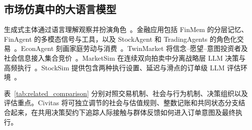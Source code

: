 \subsection{市场仿真中的大语言模型}

生成式主体通过语言理解观察并扮演角色~\cite{park2023generative}。金融应用包括 FinMem 的分层记忆、FinAgent 的多模态信号与工具，以及 StockAgent 和 TradingAgents 的角色化交易~\cite{yu2023finmem,zhang2024finagent,li2024stockagent,xiao2024tradingagents}。EconAgent 刻画家庭劳动与消费~\cite{li2024econagent}。TwinMarket 将信念--愿望--意图投资者及社会信息接入集合竞价~\cite{yang2025twinmarket}。MarketSim 在连续双向拍卖中分离战略层 LLM 决策与高频执行~\cite{marketsim2026}。StockSim 提供包含两种执行设置、延迟与滑点的订单级 LLM 评估环境~\cite{papadakis2025stocksim}。

表~\ref{tab:related_comparison} 分别对照交易机制、社会与行为机制、决策组织以及评估重点。Civitas 将可独立调节的社会与估值规则、整数记账和共同状态分支结合起来，在共用决策契约下追踪人际接触与群体反馈如何进入订单意图及最终执行。


